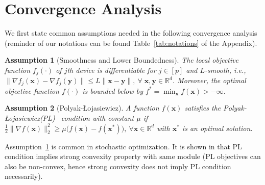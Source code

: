 \documentclass[twoside]{article}
\newcommand{\pl}{Polyak-\L{}ojasiewicz}
\newtheorem{assumption}{Assumption}
\begin{document}
\section{Convergence Analysis}\label{sec:cnvg-an}
\vspace{-0.05in}
We first state common assumptions needed in the following convergence analysis (reminder of our notations can be found Table~\ref{tab:notations} of the Appendix).
\begin{assumption}[Smoothness and Lower Boundedness]\label{Assu:1}
The local objective function $f_j(\cdot)$ of $j$th device is differentiable for $j\in [p]$ and $L$-smooth, i.e., $\|\nabla f_j(\boldsymbol{x})-\nabla f_j(\mathbf{y})\|\leq L\|\boldsymbol{x}-\mathbf{y}\|,\: \forall \;\boldsymbol{x},\mathbf{y}\in\mathbb{R}^d$. Moreover, the optimal objective function $f(\cdot)$ is bounded below by ${f^*} = \min_{\boldsymbol{x}} f(\boldsymbol{x})>-\infty$. 
\end{assumption}
\begin{assumption}[\pl]\label{assum:pl}
A function $f(\boldsymbol{x})$ satisfies the \pl (PL)~ condition with constant $\mu$ if $\frac{1}{2}\|\nabla f(\boldsymbol{x})\|_2^2\geq \mu\big(f(\boldsymbol{x})-f(\boldsymbol{x}^*)\big),\: \forall \boldsymbol{x}\in\mathbb{R}^d $ with $\boldsymbol{x}^*$ is an optimal solution.
\end{assumption}
Assumption~\ref{Assu:1} is common in stochastic optimization. 
It is shown in \cite{karimi2016linear} that PL condition implies strong convexity property with same module (PL objectives can also be non-convex, hence strong convexity does not imply PL condition necessarily).

\vspace{-0.05in}
\end{document}
